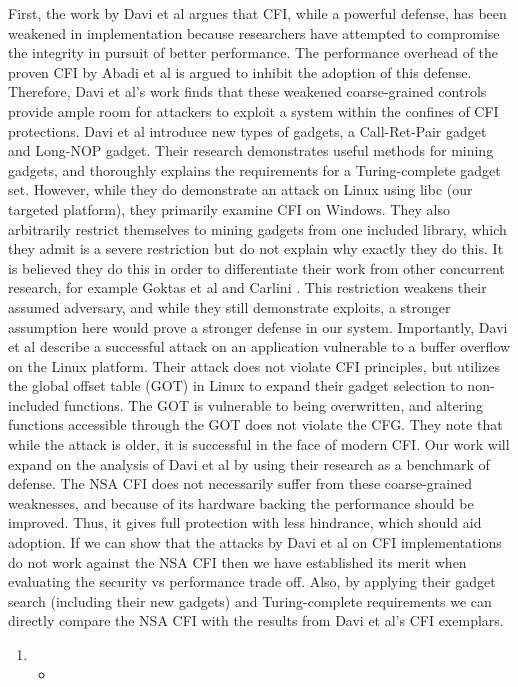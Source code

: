\documentclass[letterpaper,10pt]{article}
\begin{document}
\indent First, the work by Davi et al argues that CFI, while a powerful defense, has been weakened in implementation because researchers have attempted to compromise the integrity in pursuit of better performance\cite{Davi:2014}. The performance overhead of the proven CFI by Abadi et al\cite{abadi} is argued to inhibit the adoption of this defense. Therefore, Davi et al's work finds that these weakened coarse-grained controls provide ample room for attackers to exploit a system within the confines of CFI protections.
\newline
\indent Davi et al introduce new types of gadgets, a Call-Ret-Pair gadget and Long-NOP gadget\cite{Davi:2014}. Their research demonstrates useful methods for mining gadgets, and thoroughly explains the requirements for a Turing-complete gadget set. However, while they do demonstrate an attack on Linux using libc (our targeted platform), they primarily examine CFI on Windows. They also arbitrarily restrict themselves to mining gadgets from one included library, which they admit is a severe restriction but do not explain why exactly they do this. It is believed they do this in order to differentiate their work from other concurrent research, for example Goktas et al \cite{goktas} and Carlini \cite{carlini}. This restriction weakens their assumed adversary, and while they still demonstrate exploits, a stronger assumption here would prove a stronger defense in our system. 
\newline
\indent Importantly, Davi et al describe a successful attack on an application vulnerable to a buffer overflow on the Linux platform. Their attack does not violate CFI principles, but utilizes the global offset table (GOT) in Linux to expand their gadget selection to non-included functions. The GOT is vulnerable to being overwritten, and altering functions accessible through the GOT does not violate the CFG. They note that while the attack is older, it is successful in the face of modern CFI\cite{Bulba}.
\newline
\indent Our work will expand on the analysis of Davi et al by using their research as a benchmark of defense. The NSA CFI does not necessarily suffer from these coarse-grained weaknesses, and because of its hardware backing the performance should be improved. Thus, it gives full protection with less hindrance, which should aid adoption. If we can show that the attacks by Davi et al on CFI implementations do not work against the NSA CFI then we have established its merit when evaluating the security vs performance trade off. Also, by applying their gadget search (including their new gadgets) and Turing-complete requirements we can directly compare the NSA CFI with the results from Davi et al's CFI exemplars.
\begin{enumerate}
\item 
\begin{itemize}
\item 
\end{itemize}
\end{enumerate}
\end{document}
